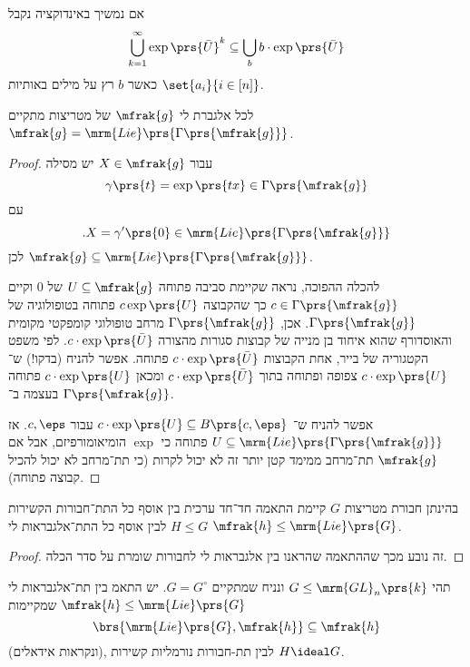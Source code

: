 \documentclass[10pt, twoside]{book}
\begin{document}
אם נמשיך באינדוקציה נקבל
\[\bigcup_{k=1}^{\infty} \exp\prs{\bar{U}}^k \subseteq \bigcup_b b \cdot \exp\prs{\bar{U}}\]
כאשר
$b$
רץ על מילים באותיות
$\set{a_i}{i \in [n]}$.

\begin{theorem}
לכל אלגברת לי
$\mfrak{g}$
של מטריצות מתקיים
$\mfrak{g} = \mrm{Lie}\prs{\Gamma\prs{\mfrak{g}}}$.
\end{theorem}

\begin{proof}
עבור
$X \in \mfrak{g}$
יש מסילה
\[\gamma\prs{t} = \exp\prs{tx} \in \Gamma\prs{\mfrak{g}}\]
עם
\[\text{.} X = \gamma'\prs{0} \in \mrm{Lie}\prs{\Gamma\prs{\mfrak{g}}}\]
לכן
$\mfrak{g} \subseteq \mrm{Lie}\prs{\Gamma\prs{\mfrak{g}}}$.

להכלה ההפוכה, נראה שקיימת סביבה פתוחה
$U \subseteq \mfrak{g}$
של
$0$
וקיים
$c \in \Gamma\prs{\mfrak{g}}$
כך שהקבוצה
$c \exp\prs{U}$
פתוחה בטופולוגיה של
$\Gamma\prs{\mfrak{g}}$.
אכן,
$\Gamma\prs{\mfrak{g}}$
מרחב טופולוגי קומפקטי מקומית והאוסדורף שהוא איחוד בן מנייה של קבוצות סגורות מהצורה
$c \cdot \exp\prs{\bar{U}}$.
לפי משפט הקטגוריה של בייר, אחת הקבוצות
$c \cdot \exp\prs{\bar{U}}$
פתוחה.
אפשר להניח (בדקו!) ש־%
$c \cdot \exp\prs{U}$
צפופה ופתוחה בתוך
$c \cdot \exp\prs{\bar{U}}$
ומכאן
$c \cdot \exp\prs{U}$
פתוחה בעצמה ב־%
$\Gamma\prs{\mfrak{g}}$.

אפשר להניח ש־%
$c \cdot \exp\prs{U} \subseteq B\prs{c, \eps}$
עבור
$c,\eps$.
אז
$U \subseteq \mrm{Lie}\prs{\Gamma\prs{\mfrak{g}}}$
פתוחה כי
$\exp$
הומיאומורפיזם, אבל אם
$\mfrak{g}$
תת־מרחב ממימד קטן יותר זה לא יכול לקרות (כי תת־מרחב לא יכול להכיל קבוצה פתוחה).
\end{proof}

\begin{theorem}
בהינתן חבורת מטריצות
$G$
קיימת התאמה חד־חד ערכית בין אוסף כל התת־חבורות הקשירות
$H \leq G$
לבין אוסף כל התת־אלגבראות לי
$\mfrak{h} \leq \mrm{Lie}\prs{G}$.
\end{theorem}

\begin{proof}
זה נובע מכך שההתאמה שהראנו בין אלגבראות לי לחבורות שומרת על סדר הכלה.
\end{proof}

\begin{proposition}
תהי
$G \leq \mrm{GL}_n\prs{k}$
ונניח שמתקיים
$G = G^\circ$.
יש התאמ בין תת־אלגבראות לי
$\mfrak{h} \leq \mrm{Lie}\prs{G}$
שמקיימות
\[\brs{\mrm{Lie}\prs{G}, \mfrak{h}} \subseteq \mfrak{h}\]
(ונקראות אידאלים), לבין תת-חבורות נורמליות קשירות
$H \ideal G$.
\end{proposition}
\end{document}
